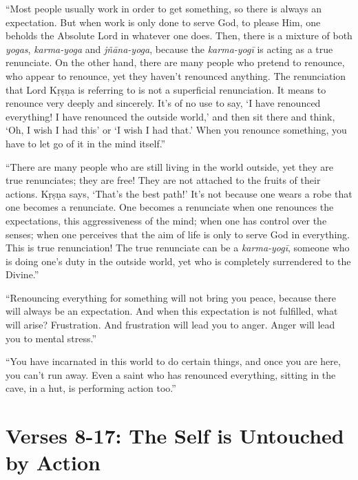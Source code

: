 \documentclass[12pt, twoside, openright]{memoir}
\begin{document}
\enquote{Most people usually work in order to get something, so there is always an expectation. But when work is only done to serve God, to please Him, one beholds the Absolute Lord in whatever one does. Then, there is a mixture of both \textit{yogas}, \textit{karma-yoga} and \textit{jñāna-yoga}, because the \textit{karma-yogī} is acting as a true renunciate. On the other hand, there are many people who pretend to renounce, who appear to renounce, yet they haven’t renounced anything. The renunciation that Lord Kṛṣṇa is referring to is not a superficial renunciation. It means to renounce very deeply and sincerely. It’s of no use to say, \enquote{I have renounced everything! I have renounced the outside world,} and then sit there and think, \enquote{Oh, I wish I had this} or \enquote{I wish I had that.} When you renounce something, you have to let go of it in the mind itself.}

\enquote{There are many people who are still living in the world outside, yet they are true renunciates; they are free! They are not attached to the fruits of their actions. Kṛṣṇa says, \enquote{That’s the best path!} It’s not because one wears a robe that one becomes a renunciate. One becomes a renunciate when one renounces the expectations, this aggressiveness of the mind; when one has control over the senses; when one perceives that the aim of life is only to serve God in everything. This is true renunciation! The true renunciate can be a \textit{karma-yogī}, someone who is doing one’s duty in the outside world, yet who is completely surrendered to the Divine.}

\enquote{Renouncing everything for something will not bring you peace, because there will always be an expectation. And when this expectation is not fulfilled, what will arise? Frustration. And frustration will lead you to anger. Anger will lead you to mental stress.}

\enquote{You have incarnated in this world to do certain things, and once you are here, you can’t run away. Even a saint who has renounced everything, sitting in the cave, in a hut, is performing action too.}

\newpage
\section{Verses 8-17: The Self is Untouched by Action}\label{sec-verses-8-17-the-self-is-untouched-by-action}
\end{document}
